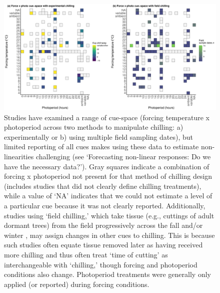 \documentclass[11pt,letter]{article}
\begin{document}
\clearpage


\clearpage
\begin{figure}[t!]
\centering
\includegraphics[width=1.1\textwidth]{..//..//analyses/limitingcues/figures/heatmapphotoxforcexchill2panel.pdf}
\caption{Studies have examined a range of cue-space (forcing temperature x photoperiod across two methods to manipulate chilling: a) experimentally or b) using multiple field sampling dates), but limited reporting of all cues makes using these data to estimate non-linearities challenging (see `Forecasting non-linear responses: Do we have the necessary data?'). Gray squares indicate a combination of forcing x photoperiod not present for that method of chilling design (includes studies that did not clearly define chilling treatments), while a value of `NA' indicates that we could not estimate a level of a particular cue because it was not clearly reported. Additionally, studies using `field chilling,' which take tissue (e.g., cuttings of adult dormant trees) from the field progressively across the fall and/or winter \citep[see][]{weinberger1950}, may assign changes in other cues to chilling. This is because such studies often equate tissue removed later as having received more chilling and thus often treat `time of cutting' as interchangeable with `chilling,'  though forcing and photoperiod conditions also change. Photoperiod treatments were generally only applied (or reported) during forcing conditions.}
  \label{fig:heatmaps} 
\end{figure}

\clearpage
\end{document}
